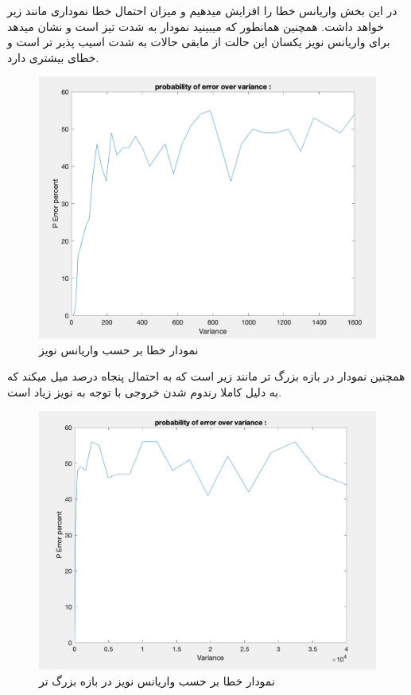 \documentclass[10pt]{article}
\begin{document}
	
	
	\newpage
	\subsubsection{ }
	در این بخش واریانس خطا را افزایش میدهیم و میزان احتمال خطا نموداری مانند زیر خواهد داشت.
	همچنین همانطور که میبینید نمودار به شدت تیز است و نشان میدهد برای واریانس نویز یکسان این حالت از مابقی حالات به شدت اسیب پذیر تر است و خطای بیشتری دارد.
	\begin{figure}[H]
		\centering
		\includegraphics[width=0.6\linewidth]{../img/3.3.10}
		\caption{نمودار خطا بر حسب واریانس نویز}
		\label{fig:3-3-10}
	\end{figure}
	
	\newpage
	همچنین نمودار در بازه بزرگ تر مانند زیر است که به احتمال پنجاه درصد میل میکند که به دلیل کاملا رندوم شدن خروجی با توجه به نویز زیاد است.
	\begin{figure}[H]
		\centering
		\includegraphics[width=0.6\linewidth]{../img/3.3.9}
		\caption{نمودار خطا بر حسب واریانس نویز در بازه بزرگ تر}
		\label{fig:3-3-9}
	\end{figure}
	
	\newpage
\end{document}
